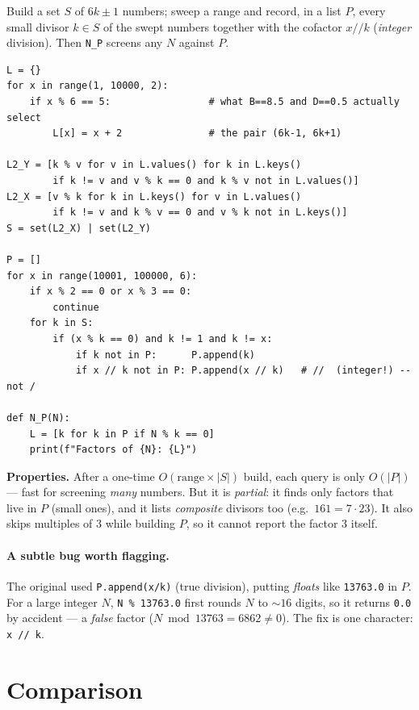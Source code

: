 \documentclass[11pt]{article}
\begin{document}
Build a set $S$ of $6k\pm1$ numbers; sweep a range and record, in a list $P$, every
small divisor $k\in S$ of the swept numbers together with the cofactor $x/\!/k$
(\emph{integer} division). Then \texttt{N\_P} screens any $N$ against $P$.

\begin{lstlisting}
L = {}
for x in range(1, 10000, 2):
    if x % 6 == 5:                 # what B==8.5 and D==0.5 actually select
        L[x] = x + 2               # the pair (6k-1, 6k+1)

L2_Y = [k % v for v in L.values() for k in L.keys()
        if k != v and v % k == 0 and k % v not in L.values()]
L2_X = [v % k for k in L.keys() for v in L.values()
        if k != v and k % v == 0 and v % k not in L.keys()]
S = set(L2_X) | set(L2_Y)

P = []
for x in range(10001, 100000, 6):
    if x % 2 == 0 or x % 3 == 0:
        continue
    for k in S:
        if (x % k == 0) and k != 1 and k != x:
            if k not in P:      P.append(k)
            if x // k not in P: P.append(x // k)   # //  (integer!) -- not /

def N_P(N):
    L = [k for k in P if N % k == 0]
    print(f"Factors of {N}: {L}")
\end{lstlisting}

\noindent\textbf{Properties.} After a one-time $O(\text{range}\times|S|)$ build,
each query is only $O(|P|)$ --- fast for screening \emph{many} numbers. But it is
\emph{partial}: it finds only factors that live in $P$ (small ones), and it lists
\emph{composite} divisors too (e.g.\ $161=7\cdot23$). It also skips multiples of $3$
while building $P$, so it cannot report the factor $3$ itself.

\paragraph{A subtle bug worth flagging.} The original used
\texttt{P.append(x/k)} (true division), putting \emph{floats} like \texttt{13763.0}
in $P$. For a large integer $N$, \texttt{N \% 13763.0} first rounds $N$ to $\sim16$
digits, so it returns \texttt{0.0} by accident --- a \emph{false} factor
($N\bmod13763=6862\neq0$). The fix is one character: \texttt{x // k}.

\section{Comparison}
\end{document}
